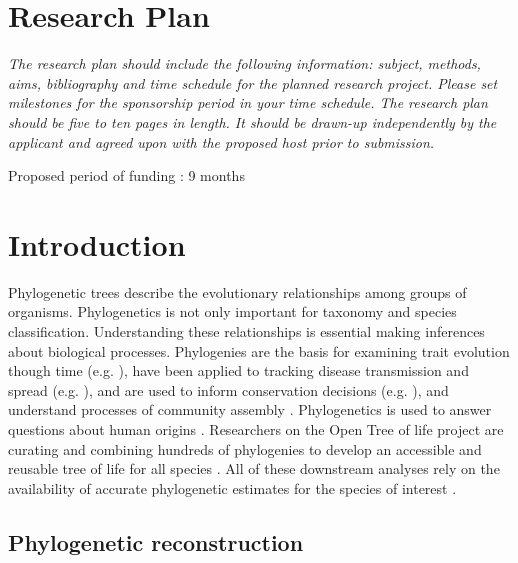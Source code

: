 \documentclass[10pt]{article}
\begin{document}
\section*{Research Plan}                   

\textsl{The research plan should include the following information: subject, methods, aims, bibliography and time schedule for the planned research project. 
Please set milestones for the sponsorship period in your time schedule.
The research plan should be five to ten pages in length.
It should be drawn-up independently by the applicant and agreed upon with the proposed host prior to submission.}

Proposed period of funding : 9 months


\section*{Introduction}
Phylogenetic trees describe the evolutionary relationships among groups of organisms. 
Phylogenetics is not only important for taxonomy and species classification. 
Understanding these relationships is essential making inferences about biological processes. 
Phylogenies are the basis for examining trait evolution though time (e.g. 
\cite{omeara_testing_2006}), have been applied to tracking disease transmission and spread (e.g. 
\cite{timme_phylogenetic_2013}), and are used to inform conservation decisions (e.g. 
\cite{isaac_mammals_2007}), and understand processes of community assembly \cite{emerson_phylogenetic_2008}. 
Phylogenetics is used to answer questions about human origins \cite{endicott_using_2010}. 
Researchers on the Open Tree of life project are curating and combining hundreds of phylogenies to develop an accessible and reusable tree of life for all species \cite{drew_lost_2013}. 
All of these downstream analyses rely on the availability of accurate phylogenetic estimates for the species of interest \cite{stoltzfus_phylotastic!_2013}.


\subsection*{Phylogenetic reconstruction}
\end{document}
